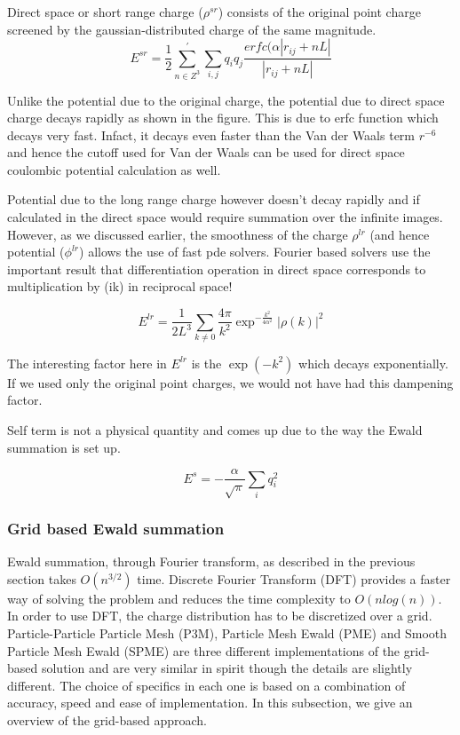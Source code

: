 \documentclass[9pt,bestpractices]{livecoms}
\begin{document}
Direct space or short range charge ($\rho^{sr}$) consists of the original point charge screened by the gaussian-distributed charge of the same magnitude. 
\[
E^{sr} = \frac{1}{2} \sum_{n \in Z^3}^{'} \sum_{i,j}q_i q_j \frac{erfc(\alpha|r_{ij} + nL|}{|r_{ij} + nL|}
\]

Unlike the potential due to the original charge, the potential due to direct space charge decays rapidly as shown in the figure. This is due to erfc function which decays very fast. Infact, it decays even faster than the Van der Waals term $r^{-6}$ and hence the cutoff used for Van der Waals can be used for direct space coulombic potential calculation as well. 

Potential due to the long range charge however doesn't decay rapidly and if calculated in the direct space would require summation over the infinite images. However, as we discussed earlier, the smoothness of the  charge $\rho^{lr}$ (and hence potential ($\phi^{lr}$) allows the use of fast pde solvers. Fourier based solvers use the important result that differentiation operation in direct space corresponds to multiplication by (ik) in reciprocal space! 

\[
E^{lr} = \frac{1}{2L^3} \sum_{k \neq 0} \frac{4\pi}{k^2} \exp^{-\frac{k^2}{4\alpha^2}} |\rho(k)|^2
\]

The interesting factor here in $E^{lr}$ is the $\exp (-k^2)$ which decays exponentially. If we used only the original point charges, we would not have had this dampening factor. 

Self term is not a physical quantity and comes up due to the way the Ewald summation is set up. 

\[
E^{s} = - \frac{\alpha}{\sqrt{\pi}}\sum_i q_i^2
\]
 
\subsubsection{Grid based Ewald summation}

Ewald summation, through Fourier transform, as described in the previous section takes $O(n^{3/2})$ time. Discrete Fourier Transform (DFT) provides a  faster way of solving the problem and reduces the time complexity to $O(n log(n))$. In order to use DFT, the charge distribution has to be discretized over a grid. Particle-Particle Particle Mesh (P3M), Particle Mesh Ewald (PME) and Smooth Particle Mesh Ewald (SPME) are three different implementations of the grid-based solution and are very similar in spirit though the details are slightly different. The choice of specifics in each one is based on a combination of accuracy, speed and ease of implementation. In this subsection, we give an overview of the grid-based approach. 
\end{document}
